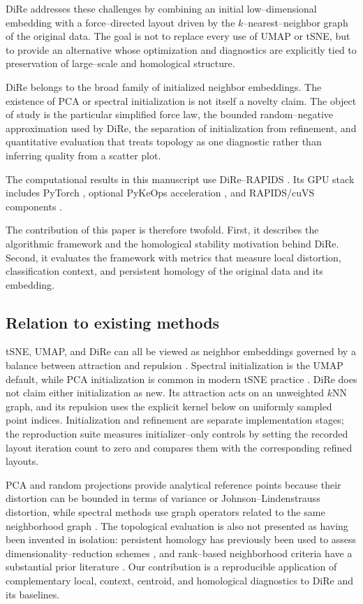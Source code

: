 \documentclass[11pt]{article}
\begin{document}
DiRe addresses these challenges by combining an initial low--dimensional embedding with a force--directed layout driven by the $k$--nearest--neighbor graph of the original data. The goal is not to replace every use of UMAP or tSNE, but to provide an alternative whose optimization and diagnostics are explicitly tied to preservation of large--scale and homological structure.

DiRe belongs to the broad family of initialized neighbor embeddings. The existence of PCA or spectral initialization is not itself a novelty claim. The object of study is the particular simplified force law, the bounded random--negative approximation used by DiRe, the separation of initialization from refinement, and quantitative evaluation that treats topology as one diagnostic rather than inferring quality from a scatter plot.

The computational results in this manuscript use DiRe--RAPIDS \cite{dire-rapids}. Its GPU stack includes PyTorch \cite{pytorch}, optional PyKeOps acceleration \cite{pykeops}, and RAPIDS/cuVS components \cite{cuml,cuvs}.

The contribution of this paper is therefore twofold. First, it describes the algorithmic framework and the homological stability motivation behind DiRe. Second, it evaluates the framework with metrics that measure local distortion, classification context, and persistent homology of the original data and its embedding.

\subsection{Relation to existing methods}

tSNE, UMAP, and DiRe can all be viewed as neighbor embeddings governed by a balance between attraction and repulsion \cite{vandermaaten-tsne,umap,bohm-attraction-repulsion}. Spectral initialization is the UMAP default, while PCA initialization is common in modern tSNE practice \cite{kobak2019art,kobak-linderman-initialization,opentsne}. DiRe does not claim either initialization as new. Its attraction acts on an unweighted $k$NN graph, and its repulsion uses the explicit kernel below on uniformly sampled point indices. Initialization and refinement are separate implementation stages; the reproduction suite measures initializer--only controls by setting the recorded layout iteration count to zero and compares them with the corresponding refined layouts.

PCA and random projections provide analytical reference points because their distortion can be bounded in terms of variance or Johnson--Lindenstrauss distortion, while spectral methods use graph operators related to the same neighborhood graph \cite{belkin-niyogi-laplacian,coifman-lafon-diffusion}. The topological evaluation is also not presented as having been invented in isolation: persistent homology has previously been used to assess dimensionality--reduction schemes \cite{rieck-leitte-2015}, and rank--based neighborhood criteria have a substantial prior literature \cite{lee-verleysen-quality}. Our contribution is a reproducible application of complementary local, context, centroid, and homological diagnostics to DiRe and its baselines.
\end{document}
